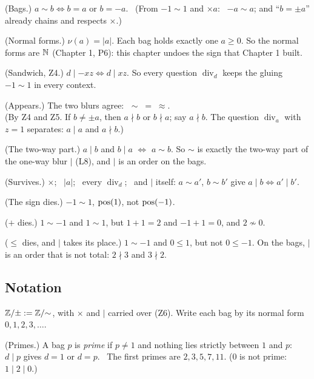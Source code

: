 \begin{lines}
\item[\lab{P5}] (Bags.) $a \sim b \iff b = a$ or $b = -a$. \ (From $-1 \sim 1$ and $\times a$: \ $-a \sim a$; and ``$b = \pm a$'' already chains and respects $\times$.)
\item[\lab{P6}] (Normal forms.) $\nu(a) = |a|$. Each bag holds exactly one $a \ge 0$. So the normal forms are $\mathbb{N}$ (Chapter 1, P6): this chapter undoes the sign that Chapter 1 built.
\item[\lab{P7}] (Sandwich, Z4.) $d \mid {-x z} \iff d \mid x z$. So every question $\operatorname{div}_d$ keeps the gluing $-1 \sim 1$ in every context.
\item[\lab{P8}] (Appears.) The two blurs agree: $\;\sim \;=\; \approx$. \\
(By Z4 and Z5. If $b \neq \pm a$, then $a \nmid b$ or $b \nmid a$; say $a \nmid b$. The question $\operatorname{div}_a$ with $z = 1$ separates: $a \mid a$ and $a \nmid b$.)
\item[\lab{P9}] (The two-way part.) $a \mid b$ and $b \mid a$ $\iff$ $a \sim b$. So $\sim$ is exactly the two-way part of the one-way blur $\mid$ (L8), and $\mid$ is an order on the bags.
\item[\lab{P10}] (Survives.) $\times$; \ $|a|$; \ every $\operatorname{div}_d$; \ and $\mid$ itself: $a \sim a'$, $b \sim b'$ give $a \mid b \iff a' \mid b'$.
\item[\lab{P11.1}] (The sign dies.) $-1 \sim 1$, $\operatorname{pos}(1)$, not $\operatorname{pos}(-1)$.
\item[\lab{P11.2}] ($+$ dies.) $1 \sim -1$ and $1 \sim 1$, but $1 + 1 = 2$ and $-1 + 1 = 0$, and $2 \not\sim 0$.
\item[\lab{P11.3}] ($\le$ dies, and $\mid$ takes its place.) $1 \sim -1$ and $0 \le 1$, but not $0 \le -1$. On the bags, $\mid$ is an order that is not total: $2 \nmid 3$ and $3 \nmid 2$.
\end{lines}

\subsection*{Notation}

\begin{lines}
\item[\lab{N1}] $\mathbb{Z}/{\pm} := \mathbb{Z}/{\sim}$, with $\times$ and $\mid$ carried over (Z6). Write each bag by its normal form $0, 1, 2, 3, \dots$.
\item[\lab{N2}] (Primes.) A bag $p$ is \emph{prime} if $p \neq 1$ and nothing lies strictly between $1$ and $p$: \ $d \mid p$ gives $d = 1$ or $d = p$. \ The first primes are $2, 3, 5, 7, 11$. ($0$ is not prime: $1 \mid 2 \mid 0$.)
\end{lines}

